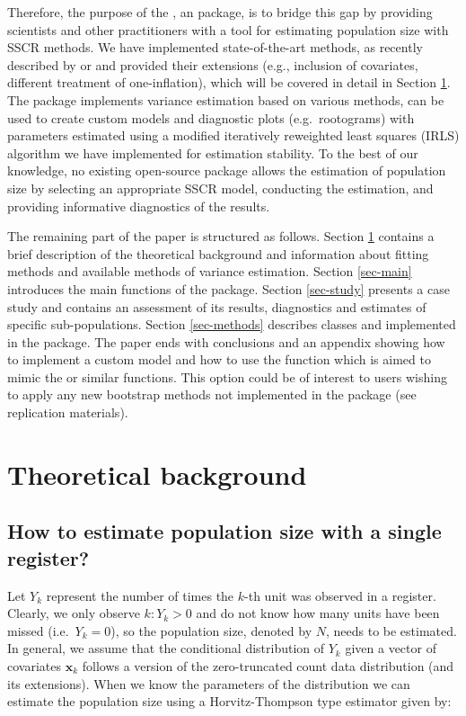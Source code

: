 \documentclass[
]{jss}
\newcommand{\1}{\mathcal{I}} \newcommand{\bZero}{\boldsymbol{0}}
\begin{document}
Therefore, the purpose of the , an 
package, is to bridge this gap by providing scientists and other
practitioners with a tool for estimating population size with SSCR
methods. We have implemented state-of-the-art methods, as recently
described by \citet{bohning2018capture} or \citet{bohning2024one} and
provided their extensions (e.g., inclusion of covariates, different
treatment of one-inflation), which will be covered in detail in Section
\ref{sec-theory}. The package implements variance estimation based on
various methods, can be used to create custom models and diagnostic
plots (e.g.~rootograms) with parameters estimated using a modified
iteratively reweighted least squares (IRLS) algorithm we have
implemented for estimation stability. To the best of our knowledge, no
existing open-source package allows the estimation of population size by
selecting an appropriate SSCR model, conducting the estimation, and
providing informative diagnostics of the results.

The remaining part of the paper is structured as follows. Section
\ref{sec-theory} contains a brief description of the theoretical
background and information about fitting methods and available methods
of variance estimation. Section \ref{sec-main} introduces the main
functions of the package. Section \ref{sec-study} presents a case study
and contains an assessment of its results, diagnostics and estimates of
specific sub-populations. Section \ref{sec-methods} describes classes
and  implemented in the package. The paper ends with
conclusions and an appendix showing how to implement a custom model and
how to use the  function which is aimed to
mimic the  or similar functions. This option could be of
interest to users wishing to apply any new bootstrap methods not
implemented in the package (see replication materials).

\section{Theoretical background}\label{sec-theory}

\subsection{How to estimate population size with a single
register?}\label{how-to-estimate-population-size-with-a-single-register}

Let \(Y_{k}\) represent the number of times the \(k\)-th unit was
observed in a register. Clearly, we only observe \(k:Y_{k}>0\) and do
not know how many units have been missed (i.e.~\(Y_{k}=0\)), so the
population size, denoted by \(N\), needs to be estimated. In general, we
assume that the conditional distribution of \(Y_{k}\) given a vector of
covariates \(\boldsymbol{x}_{k}\) follows a version of the
zero-truncated count data distribution (and its extensions). When we
know the parameters of the distribution we can estimate the population
size using a Horvitz-Thompson type estimator given by:
\end{document}
